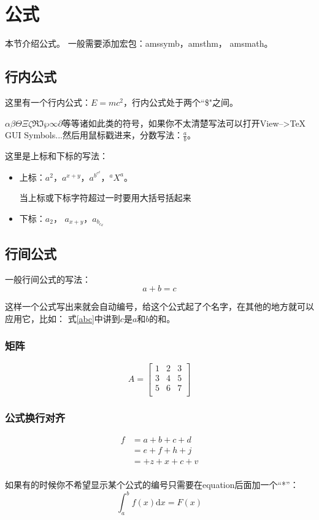 \section{公式}
本节介绍公式。
一般需要添加宏包：amssymb，amsthm， amsmath。

\subsection{行内公式}
这里有一个行内公式：$E=mc^2$，行内公式处于两个``\$"之间。

$\alpha\beta\Theta\Xi\zeta\Re\Im\wp\infty\partial$等等诸如此类的符号，如果你不太清楚写法可以打开View-->TeX GUI Symbols...然后用鼠标戳进来，分数写法：$\frac{a}{b}$。

这里是上标和下标的写法：
\begin{itemize}
  \item 上标：$a^2$，$a^{x+y}$，$a^{b^{c^d}}$，$^aX^a$。

  当上标或下标字符超过一时要用大括号括起来
  \item 下标：$a_2$， $a_{x+y}$，$a_{b_{c_d}}$
\end{itemize}

\subsection{行间公式}
一般行间公式的写法：
\begin{equation}
  a+b=c
  \label{abc}
\end{equation}

这样一个公式写出来就会自动编号，\text{\label{abc}}给这个公式起了个名字，在其他的地方就可以应用它，比如： 式\ref{abc}中讲到$c$是$a$和$b$的和。
\subsubsection{矩阵}
\begin{equation}
A=
 \left[
  \begin{array}{ccc}%
    1 & 2 & 3\\
    3 & 4 & 5\\
    5 & 6 & 7\\
  \end{array}
  \right]
\end{equation}

\subsubsection{公式换行对齐}
\begin{equation}
  \begin{aligned}
  f&=a+b+c+d\\%
   &=e+f+h+j\\
   &=+z+x+c+v\\
  \end{aligned}
\end{equation} 

如果有的时候你不希望显示某个公式的编号只需要在equation后面加一个``*''：
\begin{equation*}
  \int_a^bf(x)\mathrm{d}x=F(x)
\end{equation*}